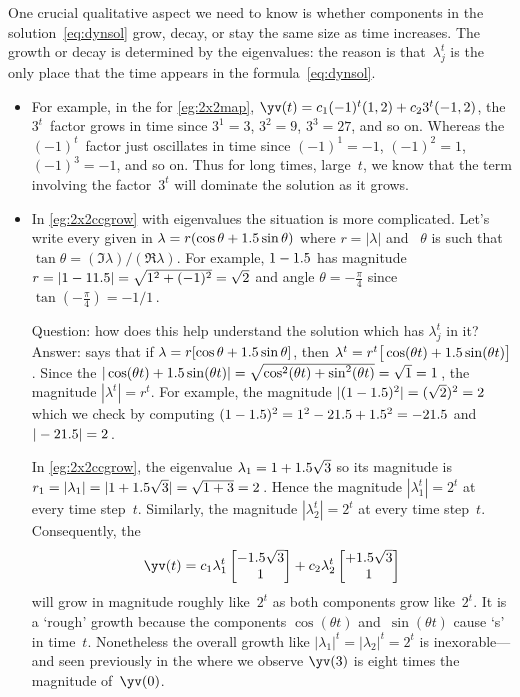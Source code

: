 One crucial qualitative aspect we need to know is whether components in the solution~\eqref{eq:dynsol} grow, decay, or stay the same size as time increases.
The growth or decay is determined by the eigenvalues:
the reason is that~\(\lambda_j^t\) is the only place that the time appears in the formula~\eqref{eq:dynsol}.
\begin{itemize}
\item For example, in the  for \autoref{eg:2x2map}, \(\yv(t)=c_1(-1)^t(1,2)+c_23^t(-1,2)\), the \(3^t\)~factor grows in time since \(3^1=3\), \(3^2=9\), \(3^3=27\), and so on.
Whereas the \((-1)^t\)~factor just oscillates in time since \((-1)^1=-1\), \((-1)^2=1\), \((-1)^3=-1\), and so on.
Thus for long times, large~\(t\), we know that the term involving the factor~\(3^t\) will dominate the solution as it grows.

\item In \autoref{eg:2x2ccgrow} with  eigenvalues the situation is more complicated.
Let's write every given  in  
\(\lambda=r(\cos\theta+1.5\sin\theta)\) where  \(r=|\lambda|\) and ~\(\theta\) is such that \(\tan\theta=(\Im\lambda)/(\Re\lambda)\).
For example, \(1-1.5\) has magnitude \(r=|1-11.5|=\sqrt{1^2+(-1)^2}=\sqrt2\) and angle \(\theta=-\frac\pi4\) since \(\tan(-\frac\pi4)=-1/1\)\,.

Question: how does this help understand the solution which has \(\lambda_j^t\) in it?
Answer:  says that if \(\lambda=r[\cos\theta+1.5\sin\theta]\), then \(\lambda^t=r^t\big[\cos(\theta t)+1.5\sin(\theta t)\big]\).
Since the  \(|\cos(\theta t)+1.5\sin(\theta t)|=\sqrt{\cos^2(\theta t)+\sin^2(\theta t)}=\sqrt1=1\)\,, the magnitude \(|\lambda^t|=r^t\).
For example, the magnitude \(|(1-1.5)^2|=(\sqrt2)^2=2\) which we check by computing \((1-1.5)^2=1^2-21.5+1.5^2=-21.5\) and \(|-21.5|=2\)\,.

In \autoref{eg:2x2ccgrow}, the eigenvalue \(\lambda_1=1+1.5\sqrt3\) so its magnitude is \(r_1=|\lambda_1|=|1+1.5\sqrt3|=\sqrt{1+3}=2\)\,.
Hence the magnitude \(|\lambda_1^t|=2^t\) at every time step~\(t\).
Similarly, the magnitude \(|\lambda_2^t|=2^t\) at every time step~\(t\).
Consequently, the 
\begin{equation*}
\yv(t)=c_1\lambda_1^t\begin{bmatrix} -\i\sqrt3\\1 \end{bmatrix}
+c_2\lambda_2^t\begin{bmatrix} +\i\sqrt3\\1 \end{bmatrix}
\end{equation*}
will grow in magnitude roughly like~\(2^t\) as both components grow like~\(2^t\).
It is a `rough' growth because the components \(\cos(\theta t)\) and~\(\sin(\theta t)\)  cause `s' in time~\(t\).
Nonetheless the overall growth like \(|\lambda_1|^t=|\lambda_2|^t=2^t\) is inexorable---and seen previously in the  where we observe \(\yv(3)\) is eight times the magnitude of~\(\yv(0)\).
\end{itemize}
